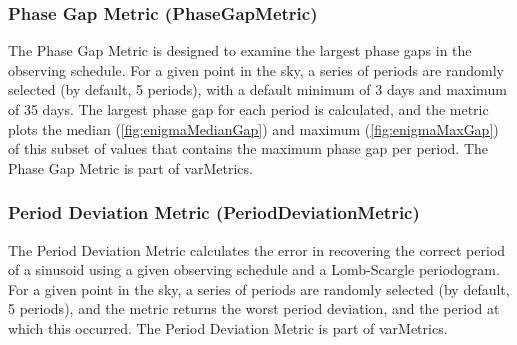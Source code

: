 \subsubsection{Phase Gap Metric (PhaseGapMetric)}

The Phase Gap Metric is designed to examine the largest phase gaps in
the observing schedule. For a given point in the sky, a series of
periods are randomly selected (by default, 5 periods), with a default
minimum of 3 days and maximum of 35 days. The largest phase gap for each
period is calculated, and the metric plots the median
(\autoref{fig:enigmaMedianGap}) and maximum (\autoref{fig:enigmaMaxGap})
of this subset of values that contains the maximum phase gap per period.
The Phase Gap Metric is part of varMetrics.

\subsubsection{Period Deviation Metric (PeriodDeviationMetric)}

The Period Deviation Metric calculates the error in recovering the
correct period of a sinusoid using a given observing schedule and a
Lomb-Scargle periodogram. For a given point in the sky, a series of
periods are randomly selected (by default, 5 periods), and the metric
returns the worst period deviation, and the period at which this
occurred. The Period Deviation Metric is part of varMetrics.








